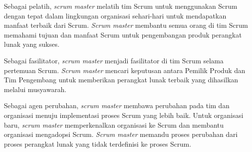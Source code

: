 \begin{enumerate}
Sebagai pelatih, \textit{scrum master} melatih tim Scrum untuk menggunakan Scrum dengan tepat dalam lingkungan organisasi sehari-hari untuk mendapatkan manfaat terbaik dari Scrum. \textit{Scrum master} membantu semua orang di tim Scrum memahami tujuan dan manfaat Scrum untuk pengembangan produk perangkat lunak yang sukses.

Sebagai fasilitator, \textit{scrum master} menjadi fasilitator di tim Scrum selama pertemuan Scrum. \textit{Scrum master} mencari keputusan antara Pemilik Produk dan Tim Pengembang untuk memberikan perangkat lunak terbaik yang dihasilkan melalui musyawarah.

Sebagai agen perubahan, \textit{scrum master} membawa perubahan pada tim dan organisasi menuju implementasi proses Scrum yang lebih baik. Untuk organisasi baru, \textit{scrum master} memperkenalkan organisasi ke Scrum dan membantu organisasi mengadopsi Scrum. \textit{Scrum master} memandu proses perubahan dari proses perangkat lunak yang tidak terdefinisi ke proses Scrum.

\end{enumerate}

